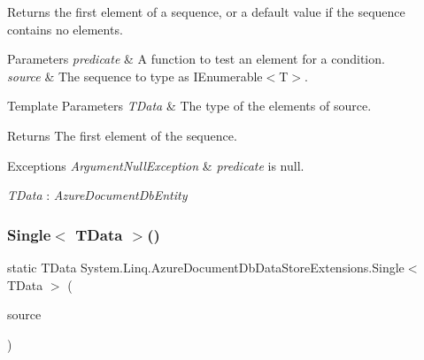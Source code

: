 Returns the first element of a sequence, or a default value if the sequence contains no elements. 


\begin{DoxyParams}{Parameters}
{\em predicate} & A function to test an element for a condition.\\
\hline
{\em source} & The sequence to type as I\+Enumerable$<$\+T$>$.\\
\hline
\end{DoxyParams}

\begin{DoxyTemplParams}{Template Parameters}
{\em T\+Data} & The type of the elements of source.\\
\hline
\end{DoxyTemplParams}
\begin{DoxyReturn}{Returns}
The first element of the sequence.
\end{DoxyReturn}

\begin{DoxyExceptions}{Exceptions}
{\em Argument\+Null\+Exception} & {\itshape predicate}  is null.\\
\hline
\end{DoxyExceptions}
\begin{Desc}
\item[Type Constraints]\begin{description}
\item[{\em T\+Data} : {\em Azure\+Document\+Db\+Entity}]\end{description}
\end{Desc}
\mbox{\label{classSystem_1_1Linq_1_1AzureDocumentDbDataStoreExtensions_a0db5f545a8b606324451bfec69db7862}} 
\subsubsection{\texorpdfstring{Single$<$ T\+Data $>$()}{Single< TData >()}\hspace{0.1cm}{\footnotesize\ttfamily [1/2]}}
{\footnotesize\ttfamily static T\+Data System.\+Linq.\+Azure\+Document\+Db\+Data\+Store\+Extensions.\+Single$<$ T\+Data $>$ (\begin{DoxyParamCaption}\item[{this \hyperlink{classCqrs_1_1Azure_1_1DocumentDb_1_1DataStores_1_1AzureDocumentDbDataStore}{Azure\+Document\+Db\+Data\+Store}$<$ T\+Data $>$}]{source }\end{DoxyParamCaption})\hspace{0.3cm}{\ttfamily [static]}}



